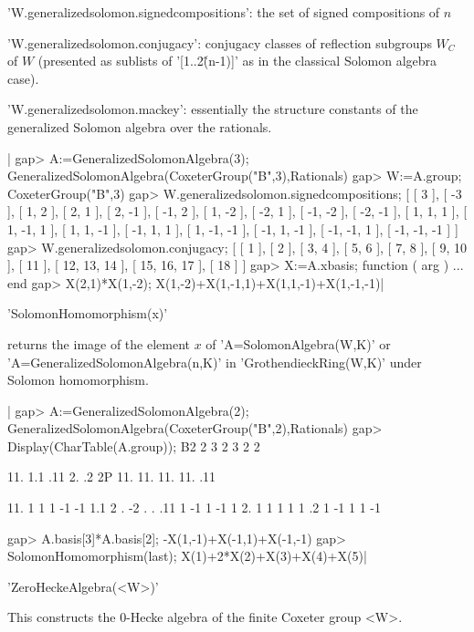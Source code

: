 'W.generalizedsolomon.signedcompositions': the set of signed compositions of
$n$

'W.generalizedsolomon.conjugacy':  conjugacy classes of reflection subgroups
$W_C$  of  $W$  (presented  as  sublists  of  '[1..2\^(n-1)]'  as in the
classical Solomon algebra case).

'W.generalizedsolomon.mackey':  essentially the  structure constants  of the
generalized Solomon algebra over the rationals.

|    gap> A:=GeneralizedSolomonAlgebra(3);
    GeneralizedSolomonAlgebra(CoxeterGroup("B",3),Rationals)
    gap> W:=A.group;
    CoxeterGroup("B",3)
    gap> W.generalizedsolomon.signedcompositions;
    [ [ 3 ], [ -3 ], [ 1, 2 ], [ 2, 1 ], [ 2, -1 ], [ -1, 2 ], [ 1, -2 ],
      [ -2, 1 ], [ -1, -2 ], [ -2, -1 ], [ 1, 1, 1 ], [ 1, -1, 1 ], [ 1, 1, -1 ],
      [ -1, 1, 1 ], [ 1, -1, -1 ], [ -1, 1, -1 ], [ -1, -1, 1 ], [ -1, -1, -1 ] ]
    gap> W.generalizedsolomon.conjugacy;
    [ [ 1 ], [ 2 ], [ 3, 4 ], [ 5, 6 ], [ 7, 8 ], [ 9, 10 ], [ 11 ],
      [ 12, 13, 14 ], [ 15, 16, 17 ], [ 18 ] ]
    gap> X:=A.xbasis;
    function ( arg ) ... end
    gap> X(2,1)*X(1,-2);
    X(1,-2)+X(1,-1,1)+X(1,1,-1)+X(1,-1,-1)|

'SolomonHomomorphism(x)'

returns  the  image  of  the  element  $x$  of  'A=SolomonAlgebra(W,K)'  or
'A=GeneralizedSolomonAlgebra(n,K)' in 'GrothendieckRing(W,K)' under Solomon
homomorphism.

|    gap> A:=GeneralizedSolomonAlgebra(2);
    GeneralizedSolomonAlgebra(CoxeterGroup("B",2),Rationals)
    gap> Display(CharTable(A.group));
    B2
         2   3   2   3   2   2

           11. 1.1 .11  2.  .2
        2P 11. 11. 11. 11. .11

    11.      1   1   1  -1  -1
    1.1      2   .  -2   .   .
    .11      1  -1   1  -1   1
    2.       1   1   1   1   1
    .2       1  -1   1   1  -1

    gap> A.basis[3]*A.basis[2];
    -X(1,-1)+X(-1,1)+X(-1,-1)
    gap> SolomonHomomorphism(last);
    X(1)+2*X(2)+X(3)+X(4)+X(5)|

'ZeroHeckeAlgebra(<W>)'

This constructs the 0-Hecke algebra of the finite Coxeter group <W>.


